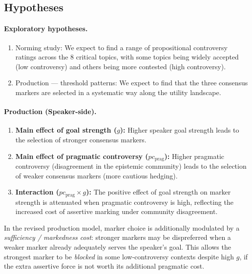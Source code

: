 \documentclass[12pt]{article}
\begin{document}
\subsection{Hypotheses}

\paragraph{Exploratory hypotheses.}
\begin{enumerate}
    \item Norming study: We expect to find a range of propositional controversy ratings across the 8 critical topics, with some topics being widely accepted (low controversy) and others being more contested (high controversy).
    \item Production --- threshold patterns: We expect to find that the three consensus markers are selected in a systematic way along the utility landscape.
\end{enumerate}

\paragraph{Production (Speaker-side).}
\begin{enumerate}[label=H\arabic*.]
    \item \textbf{Main effect of goal strength ($g$):} Higher speaker goal strength leads to the selection of stronger consensus markers.
    \item \textbf{Main effect of pragmatic controversy ($pc_{\text{prag}}$):} Higher pragmatic controversy (disagreement in the epistemic community) leads to the selection of weaker consensus markers (more cautious hedging).
    \item \textbf{Interaction ($pc_{\text{prag}} \times g$):} The positive effect of goal strength on marker strength is attenuated when pragmatic controversy is high, reflecting the increased cost of assertive marking under community disagreement.
\end{enumerate}

In the revised production model, marker choice is additionally modulated by a \emph{sufficiency / markedness cost}: stronger markers may be dispreferred when a weaker marker already adequately serves the speaker's goal. This allows the strongest marker to be \emph{blocked} in some low-controversy contexts despite high $g$, if the extra assertive force is not worth its additional pragmatic cost.
\end{document}
